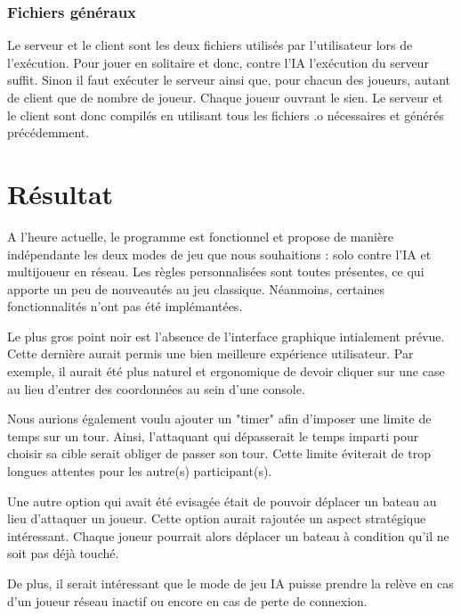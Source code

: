 \documentclass[a4paper,12pt]{article}
\begin{document}
\subsubsection{Fichiers généraux}
    Le serveur et le client sont les deux fichiers utilisés par l'utilisateur lors de l'exécution. Pour jouer en solitaire et donc, contre l'IA l'exécution du serveur suffit. Sinon il faut exécuter le serveur ainsi que, pour chacun des joueurs, autant de client que de nombre de joueur. Chaque joueur ouvrant le sien. Le serveur et le client sont donc compilés en utilisant tous les fichiers .o nécessaires et générés précédemment. 

\newpage
\section {Résultat} 
A l'heure actuelle, le programme est fonctionnel et propose de manière indépendante les deux modes de jeu que nous souhaitions : solo contre l'IA et multijoueur en réseau. Les règles personnalisées sont toutes présentes, ce qui apporte un peu de nouveautés au jeu classique.
Néanmoins, certaines fonctionnalités n'ont pas été implémantées. 
\vspace{2\baselineskip}

    Le plus gros point noir est l'absence de l'interface graphique intialement prévue. Cette dernière aurait permis une bien meilleure expérience utilisateur. Par exemple, il aurait été plus naturel et ergonomique de devoir cliquer sur une case au lieu d'entrer des coordonnées au sein d'une console. 
        \vspace{2\baselineskip}

     Nous aurions également voulu ajouter un "timer" afin d'imposer une limite de temps sur un tour. Ainsi, l'attaquant qui dépasserait le temps imparti pour choisir sa cible serait obliger de passer son tour. Cette limite éviterait de trop longues attentes pour les autre(s) participant(s).
      
     \vspace{2\baselineskip}
    Une autre option qui avait été evisagée était de pouvoir déplacer un bateau au lieu d'attaquer un joueur. Cette option aurait rajoutée un aspect stratégique intéressant. Chaque joueur pourrait alors déplacer un bateau à condition qu'il ne soit pas déjà touché.
    
     
     \vspace{2\baselineskip}
      De plus, il serait intéressant que le mode de jeu IA puisse prendre la relève en cas d'un joueur réseau inactif ou encore en cas de perte de connexion.
      
\end{document}
